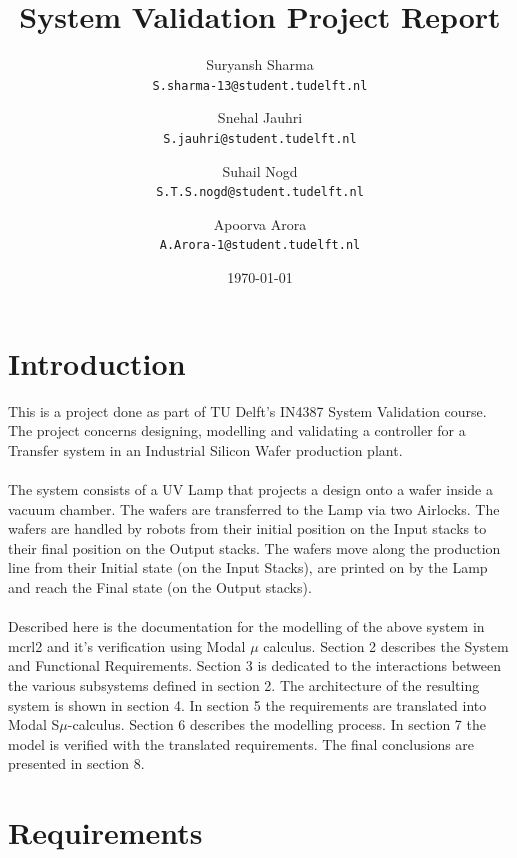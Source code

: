 \documentclass[a4paper,12pt]{article}
\begin{document}
	
	\title{System Validation Project Report}
	\author{
		Suryansh Sharma \\ 
		\texttt{S.sharma-13@student.tudelft.nl}
		\and 
		Snehal Jauhri \\
		\texttt{S.jauhri@student.tudelft.nl} 
		\and
		Suhail Nogd \\
		\texttt{S.T.S.nogd@student.tudelft.nl} 	
		\and 
		Apoorva Arora\\
		\texttt{A.Arora-1@student.tudelft.nl} 
	}
	
	\date {\today}
	\maketitle
	\newpage
	\tableofcontents
	
	\newpage
	\section{Introduction}
	This is a project done as part of TU Delft's IN4387 System Validation course. The project concerns designing, modelling and validating a controller for a Transfer system in an Industrial Silicon Wafer production plant.
	\\
	\\The system consists of a UV Lamp that projects a design onto a wafer inside a vacuum chamber. The wafers are transferred to the Lamp via two Airlocks. The wafers are handled by robots from their initial position on the Input stacks to their final position on the Output stacks. The wafers move along the production line from their Initial state (on the Input Stacks), are printed on by the Lamp and reach the Final state (on the Output stacks).
	\\
	\\Described here is the documentation for the modelling of the above system in mcrl2 and it's verification using Modal $\mu$ calculus. Section 2 describes the System and Functional Requirements. Section 3 is dedicated to the interactions between the various subsystems defined in section 2. The architecture of the resulting system is shown in section 4. In section 5 the requirements are translated into Modal S$\mu$-calculus. Section 6 describes the modelling process. In section 7 the model is verified with the translated requirements. The final conclusions are presented in section 8.
	
	\section{Requirements}
	
\end{document}
